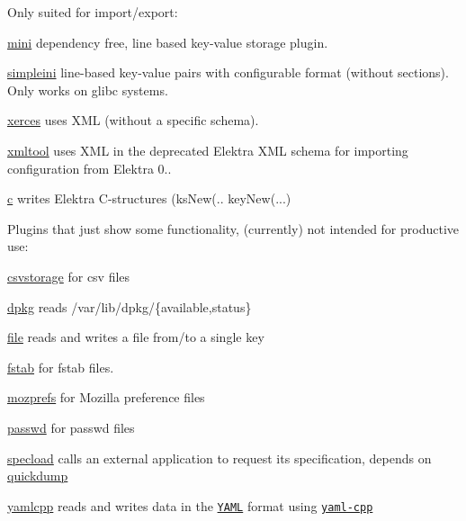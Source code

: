 Only suited for import/export\+:


\begin{DoxyItemize}
\item \hyperlink{autotoc_md377_src_plugins_mini_README_md}{mini} dependency free, line based key-\/value storage plugin.
\item \hyperlink{autotoc_md606_src_plugins_simpleini_README_md}{simpleini} line-\/based key-\/value pairs with configurable format (without sections). Only works on glibc systems.
\item \hyperlink{autotoc_md774_src_plugins_xerces_README_md}{xerces} uses X\+ML (without a specific schema).
\item \hyperlink{autotoc_md781_src_plugins_xmltool_README_md}{xmltool} uses X\+ML in the deprecated Elektra X\+ML schema for importing configuration from Elektra 0..
\item \hyperlink{autotoc_md69_src_plugins_c_README_md}{c} writes Elektra C-\/structures ({\ttfamily ks\+New(.. key\+New(...})
\end{DoxyItemize}

Plugins that just show some functionality, (currently) not intended for productive use\+:


\begin{DoxyItemize}
\item \hyperlink{autotoc_md123_src_plugins_csvstorage_README_md}{csvstorage} for csv files
\item \hyperlink{autotoc_md193_src_plugins_dpkg_README_md}{dpkg} reads /var/lib/dpkg/\{available,status\}
\item \hyperlink{autotoc_md217_src_plugins_file_README_md}{file} reads and writes a file from/to a single key
\item \hyperlink{autotoc_md231_src_plugins_fstab_README_md}{fstab} for fstab files.
\item \hyperlink{autotoc_md447_src_plugins_mozprefs_README_md}{mozprefs} for Mozilla preference files
\item \hyperlink{autotoc_md486_src_plugins_passwd_README_md}{passwd} for passwd files
\item \hyperlink{autotoc_md625_src_plugins_specload_README_md}{specload} calls an external application to request its specification, depends on \hyperlink{autotoc_md533_src_plugins_quickdump_README_md}{quickdump}
\item \hyperlink{autotoc_md817_src_plugins_yamlcpp_README_md}{yamlcpp} reads and writes data in the \href{http://www.yaml.org}{\tt Y\+A\+ML} format using \href{https://github.com/jbeder/yaml-cpp}{\tt yaml-\/cpp}
\end{DoxyItemize}

